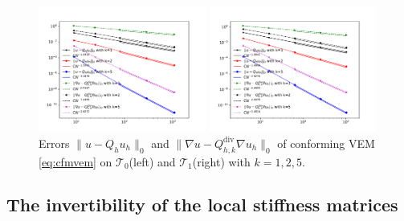 \documentclass[10pt]{amsart}
\renewcommand{\div}{\operatorname{div}}
\numberwithin{equation}{section}
\begin{document}
\begin{figure}[htbp]
\centering
\begin{minipage}[t]{0.49\linewidth}
\centering
\includegraphics[width=5.5cm]{./figures/cvem_convex.pdf}
\end{minipage}%
\begin{minipage}[t]{0.49\linewidth}
\centering
\includegraphics[width=5.5cm]{./figures/cvem_nonconvex.pdf}
\end{minipage}%
\centering
\caption{Errors $\|u - Q_h u_h\|_0$ and $\|\nabla u - Q_{h, k}^{\div}\nabla u_h\|_0$ 
of conforming VEM \eqref{eq:cfmvem} on $\mathcal T_0$(left) and 
$\mathcal T_1$(right) with $k=1, 2, 5$.}
\label{fig:rate2}
\end{figure}


\subsection{The invertibility of the local stiffness matrices}
\end{document}
